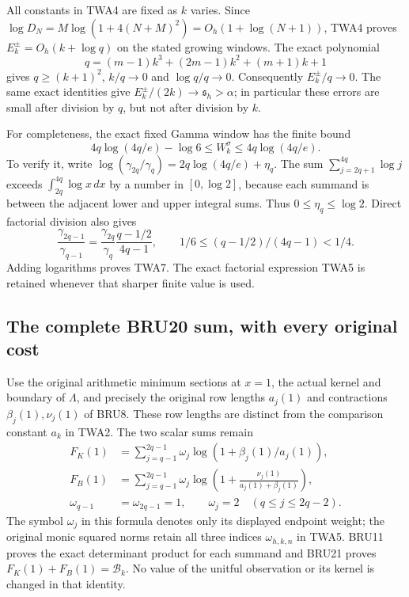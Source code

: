 \documentclass[11pt,a4paper]{article}
\begin{document}
All constants in TWA4 are fixed as $k$ varies. Since
$\log D_N=M\log(1+4(N+M)^2)=O_h(1+\log(N+1))$, TWA4 proves
$E_k^\pm=O_h(k+\log q)$ on the stated growing windows. The exact
polynomial
\[
q=(m-1)k^3+(2m-1)k^2+(m+1)k+1
\]
gives $q\ge(k+1)^2$, $k/q\to0$ and $\log q/q\to0$. Consequently
$E_k^\pm/q\to0$. The same exact identities give
$E_k^\pm/(2k)\to\mathfrak s_h>\alpha$; in particular these errors
are small after division by $q$, but not after division by $k$.

For completeness, the exact fixed Gamma window has the finite bound
\[
4q\log(4q/e)-\log6\le W_k^\sigma\le4q\log(4q/e).
\tag{TWA7}
\]
To verify it, write
$\log(\gamma_{2q}/\gamma_q)=2q\log(4q/e)+\eta_q$.
The sum $\sum_{j=2q+1}^{4q}\log j$ exceeds
$\int_{2q}^{4q}\log x\,dx$ by a number in $[0,\log2]$, because
each summand is between the adjacent lower and upper integral sums.
Thus $0\le\eta_q\le\log2$. Direct factorial division also gives
\[
\frac{\gamma_{2q-1}}{\gamma_{q-1}}
=\frac{\gamma_{2q}}{\gamma_q}\frac{q-1/2}{4q-1},
\qquad 1/6\le(q-1/2)/(4q-1)<1/4.
\]
Adding logarithms proves TWA7. The exact factorial expression TWA5
is retained whenever that sharper finite value is used.

\subsection{The complete BRU20 sum, with every original cost}

Use the original arithmetic minimum sections at $x=1$, the actual
kernel and boundary of $\Lambda$, and precisely the original row
lengths $a_j(1)$ and contractions $\beta_j(1),\nu_j(1)$ of BRU8.
These row lengths are distinct from the comparison constant $a_k$
in TWA2. The two scalar sums remain
\[
\begin{aligned}
F_K(1)&=\sum_{j=q-1}^{2q-1}\omega_j
          \log(1+\beta_j(1)/a_j(1)),\\
F_B(1)&=\sum_{j=q-1}^{2q-1}\omega_j
          \log\left(1+\frac{\nu_j(1)}{a_j(1)+\beta_j(1)}\right),\\
\omega_{q-1}&=\omega_{2q-1}=1,
\qquad\omega_j=2\quad(q\le j\le2q-2).
\end{aligned}\tag{TWA8}
\]
The symbol $\omega_j$ in this formula denotes only its displayed
endpoint weight; the original monic squared norms retain all three
indices $\omega_{h,k,n}$ in TWA5. BRU11 proves the exact determinant
product for each summand and BRU21 proves
$F_K(1)+F_B(1)=\mathcal B_k$. No value of the unitful observation or
its kernel is changed in that identity.
\end{document}
